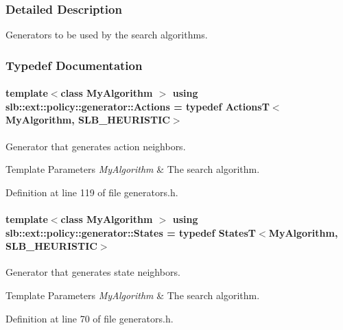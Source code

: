 \subsubsection{Detailed Description}
Generators to be used by the search algorithms. 

\subsubsection{Typedef Documentation}
\paragraph[{\texorpdfstring{Actions}{Actions}}]{\setlength{\rightskip}{0pt plus 5cm}template$<$class My\+Algorithm $>$ using {\bf slb\+::ext\+::policy\+::generator\+::\+Actions} = typedef {\bf ActionsT}$<$My\+Algorithm, S\+L\+B\+\_\+\+H\+E\+U\+R\+I\+S\+T\+IC$>$}\hypertarget{namespaceslb_1_1ext_1_1policy_1_1generator_aa810b71d654db732e5433be0f4baf4fa}{}\label{namespaceslb_1_1ext_1_1policy_1_1generator_aa810b71d654db732e5433be0f4baf4fa}


Generator that generates action neighbors. 


\begin{DoxyTemplParams}{Template Parameters}
{\em My\+Algorithm} & The search algorithm. \\
\hline
\end{DoxyTemplParams}


Definition at line 119 of file generators.\+h.

\paragraph[{\texorpdfstring{States}{States}}]{\setlength{\rightskip}{0pt plus 5cm}template$<$class My\+Algorithm $>$ using {\bf slb\+::ext\+::policy\+::generator\+::\+States} = typedef {\bf StatesT}$<$My\+Algorithm, S\+L\+B\+\_\+\+H\+E\+U\+R\+I\+S\+T\+IC$>$}\hypertarget{namespaceslb_1_1ext_1_1policy_1_1generator_a712500d6a77d98fdbc9baace652dc5ee}{}\label{namespaceslb_1_1ext_1_1policy_1_1generator_a712500d6a77d98fdbc9baace652dc5ee}


Generator that generates state neighbors. 


\begin{DoxyTemplParams}{Template Parameters}
{\em My\+Algorithm} & The search algorithm. \\
\hline
\end{DoxyTemplParams}


Definition at line 70 of file generators.\+h.

